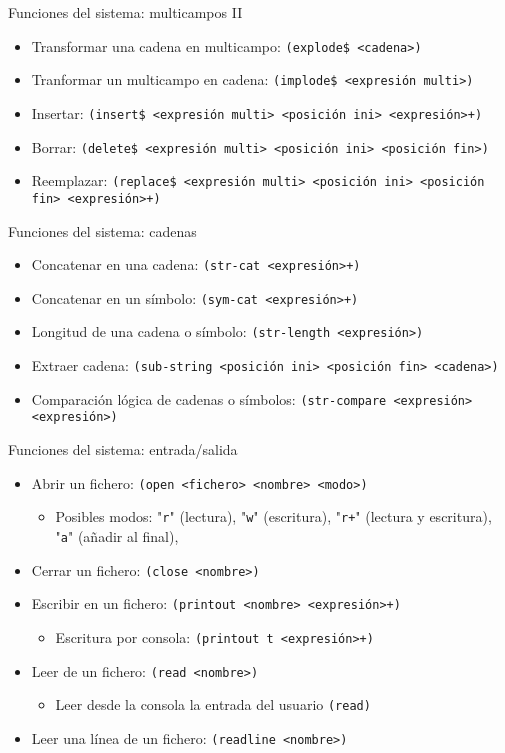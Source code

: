 \documentclass[usenames,dvipsnames,aspectratio=169]{beamer}
\begin{document}
\begin{frame}{Funciones del sistema: multicampos II}
	\begin{itemize}
		\item Transformar una cadena en multicampo: \texttt{(explode\$ <cadena>)}
		\item Tranformar un multicampo en cadena: \texttt{(implode\$ <expresión multi>)}
		\item Insertar: \texttt{(insert\$ <expresión multi> <posición ini> <expresión>+)}
		\item Borrar: \texttt{(delete\$ <expresión multi> <posición ini> <posición fin>)}
		\item Reemplazar: \texttt{(replace\$ <expresión multi> <posición ini> <posición fin> <expresión>+)}
	\end{itemize}
\end{frame}

\begin{frame}{Funciones del sistema: cadenas}
	\begin{itemize}
		\item Concatenar en una cadena: \texttt{(str-cat <expresión>+)}
		\item Concatenar en un símbolo: \texttt{(sym-cat <expresión>+)}
		\item Longitud de una cadena o símbolo: \texttt{(str-length <expresión>)}
		\item Extraer cadena: \texttt{(sub-string <posición ini> <posición fin> <cadena>)}
		\item Comparación lógica de cadenas o símbolos: \texttt{(str-compare <expresión> <expresión>)}
	\end{itemize}
\end{frame}

\begin{frame}{Funciones del sistema: entrada/salida}
	\begin{itemize}
		\item Abrir un fichero: \texttt{(open <fichero> <nombre> <modo>)}
		\begin{itemize}
			\item Posibles modos: "\texttt{r}" (lectura), "\texttt{w}" (escritura), "\texttt{r+}" (lectura y escritura), "\texttt{a}" (añadir al final),
		\end{itemize}
		\item Cerrar un fichero: \texttt{(close <nombre>)}
		\item Escribir en un fichero: \texttt{(printout <nombre> <expresión>+)}
		\begin{itemize}
			\item Escritura por consola: \texttt{(printout t <expresión>+)}
		\end{itemize}
		\item Leer de un fichero: \texttt{(read <nombre>)}
		\begin{itemize}
			\item Leer desde la consola la entrada del usuario \texttt{(read)}
		\end{itemize}
		\item Leer una línea de un fichero: \texttt{(readline <nombre>)}
	\end{itemize}
\end{frame}
\end{document}
